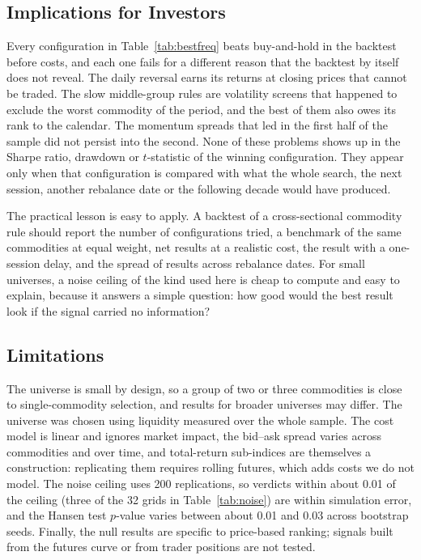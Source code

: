 \documentclass[commodities,article,submit,pdftex,moreauthors]{Definitions/mdpi}
\begin{document}
\subsection{Implications for Investors}

Every configuration in Table~\ref{tab:bestfreq} beats buy-and-hold in the backtest before costs, and each one fails for a different reason that the backtest by itself does not reveal. The daily reversal earns its returns at closing prices that cannot be traded. The slow middle-group rules are volatility screens that happened to exclude the worst commodity of the period, and the best of them also owes its rank to the calendar. The momentum spreads that led in the first half of the sample did not persist into the second. None of these problems shows up in the Sharpe ratio, drawdown or $t$-statistic of the winning configuration. They appear only when that configuration is compared with what the whole search, the next session, another rebalance date or the following decade would have produced.

The practical lesson is easy to apply. A backtest of a cross-sectional commodity rule should report the number of configurations tried, a benchmark of the same commodities at equal weight, net results at a realistic cost, the result with a one-session delay, and the spread of results across rebalance dates. For small universes, a noise ceiling of the kind used here is cheap to compute and easy to explain, because it answers a simple question: how good would the best result look if the signal carried no information?

\subsection{Limitations}\label{sec:limits}

The universe is small by design, so a group of two or three commodities is close to single-commodity selection, and results for broader universes may differ. The universe was chosen using liquidity measured over the whole sample. The cost model is linear and ignores market impact, the bid--ask spread varies across commodities and over time, and total-return sub-indices are themselves a construction: replicating them requires rolling futures, which adds costs we do not model. The noise ceiling uses 200 replications, so verdicts within about 0.01 of the ceiling (three of the 32 grids in Table~\ref{tab:noise}) are within simulation error, and the Hansen test $p$-value varies between about 0.01 and 0.03 across bootstrap seeds. Finally, the null results are specific to price-based ranking; signals built from the futures curve or from trader positions \citep{koijen2018,kang2020} are not tested.
\end{document}

